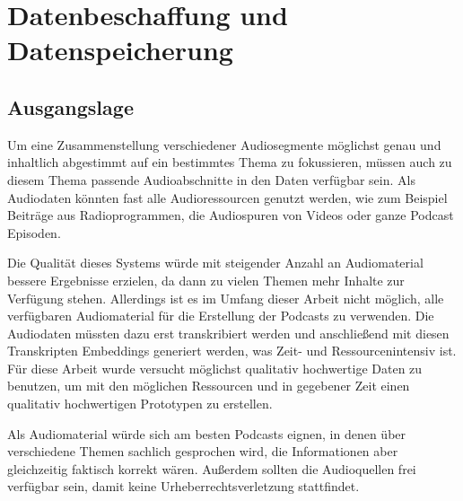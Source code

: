 \chapter{Datenbeschaffung und Datenspeicherung}\label{ch:data}

\section{Ausgangslage}

Um eine Zusammenstellung verschiedener Audiosegmente möglichst genau und inhaltlich abgestimmt auf ein bestimmtes Thema zu fokussieren, müssen auch zu diesem Thema passende Audioabschnitte in den Daten verfügbar sein.
Als Audiodaten könnten fast alle Audioressourcen genutzt werden, wie zum Beispiel Beiträge aus Radioprogrammen, die Audiospuren von Videos oder ganze Podcast Episoden.

Die Qualität dieses Systems würde mit steigender Anzahl an Audiomaterial bessere Ergebnisse erzielen, da dann zu vielen Themen mehr Inhalte zur Verfügung stehen.
Allerdings ist es im Umfang dieser Arbeit nicht möglich, alle verfügbaren Audiomaterial für die Erstellung der Podcasts zu verwenden.
Die Audiodaten müssten dazu erst transkribiert werden und anschließend mit diesen Transkripten Embeddings generiert werden, was Zeit- und Ressourcenintensiv ist.
Für diese Arbeit wurde versucht möglichst qualitativ hochwertige Daten zu benutzen, um mit den möglichen Ressourcen und in gegebener Zeit einen qualitativ hochwertigen Prototypen zu erstellen. 

Als Audiomaterial würde sich am besten Podcasts eignen, in denen über verschiedene Themen sachlich gesprochen wird, die Informationen aber gleichzeitig faktisch korrekt wären.
Außerdem sollten die Audioquellen frei verfügbar sein, damit keine Urheberrechtsverletzung stattfindet.








